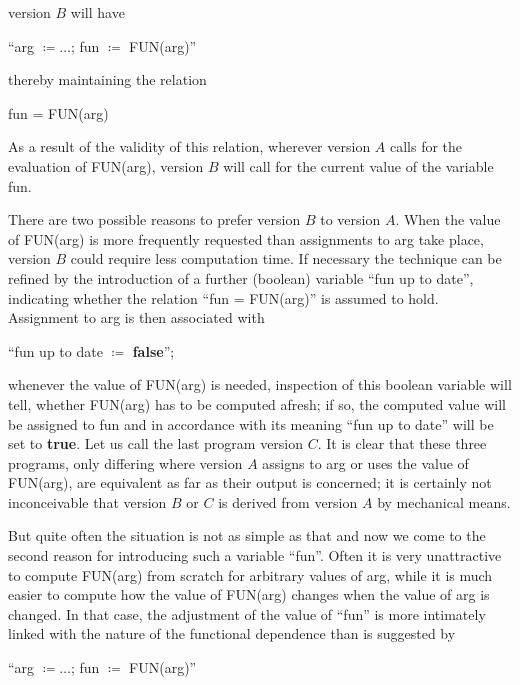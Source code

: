 \documentclass[twoside,11pt]{book}
\begin{document}
\noindent
version $B$ will have
\medskip

{
	\setlength{\parindent}{8em}
	\hspace{-.4em}``arg $\coloneq \dots$; fun $\coloneq$ FUN(arg)''
	
}
\medskip

\noindent
thereby maintaining the relation
\medskip

{
	\setlength{\parindent}{8em}
	fun = FUN(arg)
}
\medskip

\noindent
As a result of the validity of this relation, wherever version $A$ calls for the evaluation of FUN(arg), version $B$ will call for the current value of the variable fun.

There are two possible reasons to prefer version $B$ to version $A$. When the value of FUN(arg) is more frequently requested than assignments to arg take place, version $B$ could require less computation time. If necessary the technique can be refined by the introduction of a further (boolean) variable ``fun up to date'', indicating whether the relation ``fun = FUN(arg)'' is assumed to hold. Assignment to arg is then associated with
\medskip

{
	\setlength{\parindent}{8em}
	\hspace{-.4em}``fun up to date $\coloneq$ \textbf{false}'';
}
\medskip

\noindent
whenever the value of FUN(arg) is needed, inspection of this boolean variable will tell, whether FUN(arg) has to be computed afresh; if so, the computed value will be assigned to fun and in accordance with its meaning ``fun up to date'' will be set to \textbf{true}. Let us call the last program version $C$. It is clear that these three programs, only differing where version $A$ assigns to arg or uses the value of FUN(arg), are equivalent as far as their output is concerned; it is certainly not inconceivable that version $B$ or $C$ is derived from version $A$ by mechanical means.

But quite often the situation is not as simple as that and now we come to the second reason for introducing such a variable ``fun''. Often it is very unattractive to compute FUN(arg) from scratch for arbitrary values of arg, while it is much easier to compute how the value of FUN(arg) changes when the value of arg is changed. In that case, the adjustment of the value of ``fun'' is more intimately linked with the nature of the functional dependence than is suggested by
\medskip

{
	\setlength{\parindent}{8em}
	\hspace{-.4em}``arg $\coloneq\dots$; fun $\coloneq$ FUN(arg)''
}
\medskip
\end{document}
